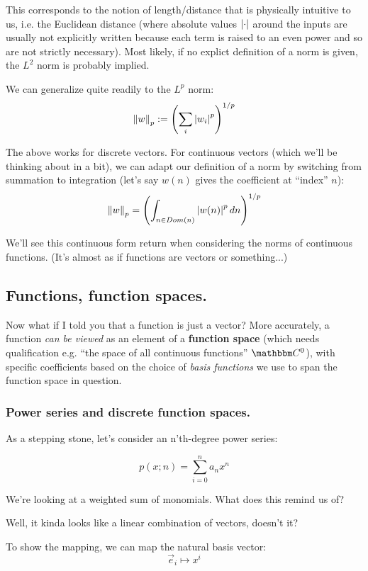 \documentclass[letterpaper,12pt]{report}
\begin{document}
This corresponds to the notion of
length/distance that is physically intuitive to us,
i.e. the Euclidean distance (where absolute values 
\(\left|\cdot\right|\) around the inputs
are usually not explicitly written because each term
is raised to an even power and so are not strictly necessary).
Most likely, if no explict definition of a norm is given,
the \(L^2\) norm is probably implied.\par
We can generalize quite readily to the \(L^p\) norm:
\[\norm[w]_p := \left(\sum_{i} \abs{w_i}^p\right)^{1/p}\]

The above works for discrete vectors. 
For continuous vectors (which we'll be thinking about in a bit),
we can adapt our definition of a norm
by switching from summation to
integration (let's say \(w(n)\) gives the coefficient at
``index'' \(n\)):
\[\norm[w]_p = \left(\int_{n \in Dom(n)} \abs{w(n)}^p dn\right)^{1/p} \]

We'll see this continuous form return when considering
the norms of continuous functions. (It's almost as if
functions are vectors or something...)

\subsection{Functions, function spaces.}

Now what if I told you that a function is just a vector?
More accurately, a function \emph{can be viewed}
as an element of a \textbf{function space} (which needs qualification \textemdash{}
e.g. ``the space of all continuous functions'' \(\domain{C}^0\)), 
with specific coefficients
based on the choice of \emph{basis functions} we use to span the function space in question.

\subsubsection{Power series and discrete function spaces.}


As a stepping stone, let's consider an n'th-degree power series:

\[p(x;n) = \sum_{i=0}^{n}a_n x^n \]

We're looking at a weighted sum of monomials. 
What does this remind us of?\par

Well, it kinda looks like a linear combination of vectors, doesn't it?\par

To show the mapping, we can map the natural basis vector:
\[\vec{e}_i \mapsto x^i \]
\end{document}
